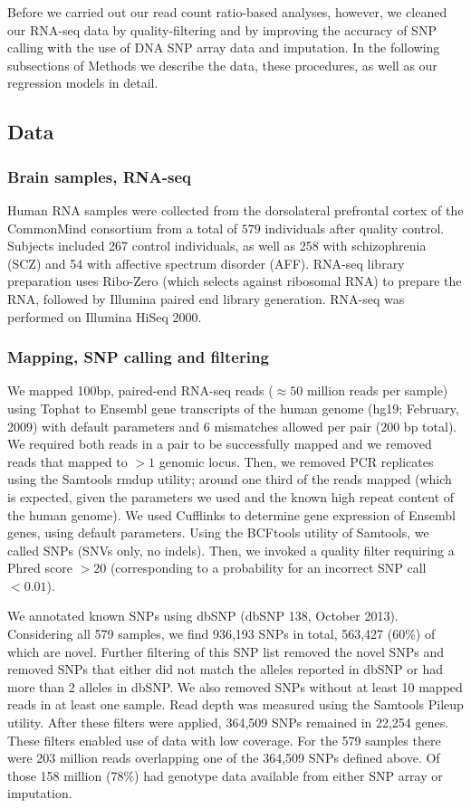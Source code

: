 \documentclass[letterpaper]{article}
\begin{document}
Before we carried out our read count ratio-based analyses, however, we cleaned
our RNA-seq data by quality-filtering and by improving the accuracy of SNP
calling with the use of DNA SNP array data and imputation. In the following
subsections of Methods we describe the data, these procedures, as well as our
regression models in detail.

\subsection{Data}

\subsubsection{Brain samples, RNA-seq}

Human RNA samples were collected from the dorsolateral prefrontal cortex of
the CommonMind consortium from a total of \(579\) individuals after
quality control. Subjects included 267 control individuals, as well as 258
with schizophrenia (SCZ) and 54 with affective spectrum disorder (AFF).
RNA-seq library preparation uses Ribo-Zero (which selects against ribosomal
RNA) to prepare the RNA, followed by Illumina paired end library generation.
RNA-seq was performed on Illumina HiSeq 2000.

\subsubsection{Mapping, SNP calling and filtering}

We mapped 100bp, paired-end RNA-seq reads (\(\approx50\) million reads per sample) using Tophat
to Ensembl gene transcripts of the human genome (hg19; February, 2009) with
default parameters and 6 mismatches allowed per pair (200 bp total). We
required both reads in a pair to be successfully mapped and we removed reads
that mapped to \(>1\) genomic locus. Then, we removed PCR replicates using the
Samtools rmdup utility; around one third of the reads mapped (which is
expected, given the parameters we used and the known high repeat content of
the human genome). We used Cufflinks to determine gene expression of Ensembl
genes, using default parameters. Using the BCFtools utility of Samtools, we
called SNPs (SNVs only, no indels). Then, we invoked a quality filter
requiring a Phred score \(>20\) (corresponding to a probability for an
incorrect SNP call \(<0.01\)).

We annotated known SNPs using dbSNP (dbSNP 138, October 2013). Considering all
579 samples, we find 936,193 SNPs in total, 563,427 (60\%) of which are novel.
Further filtering of this SNP list removed the novel SNPs and removed SNPs
that either did not match the alleles reported in dbSNP or had more than 2
alleles in dbSNP. We also removed SNPs without at least 10 mapped reads in at
least one sample. Read depth was measured using the Samtools Pileup utility.
After these filters were applied, 364,509 SNPs remained in 22,254 genes. These
filters enabled use of data with low coverage.  For the 579
samples there were 203 million reads overlapping one of the
364,509 SNPs defined above.  Of those 158 million (78\%) had genotype data
available from either SNP array or imputation.
\end{document}
